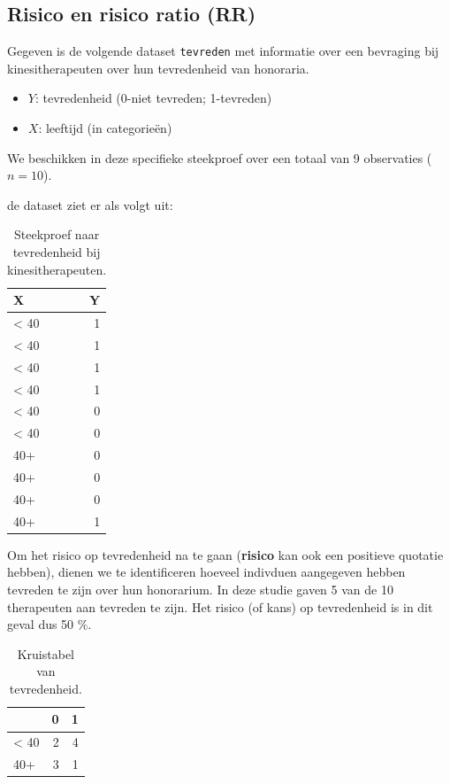 \documentclass[
]{book}
\providecommand{\tightlist}{%
  \setlength{\itemsep}{0pt}\setlength{\parskip}{0pt}}
\theoremstyle{definition}
\theoremstyle{definition}
\theoremstyle{definition}
\theoremstyle{definition}
\theoremstyle{remark}
\begin{document}
\hypertarget{risico-en-risico-ratio-rr}{%
\subsection*{Risico en risico ratio (RR)}\label{risico-en-risico-ratio-rr}}


Gegeven is de volgende dataset \texttt{tevreden} met informatie over een bevraging bij kinesitherapeuten over hun tevredenheid van honoraria.

\begin{itemize}
\tightlist
\item
  \(Y\): tevredenheid (0-niet tevreden; 1-tevreden)
\item
  \(X\): leeftijd (in categorieën)
\end{itemize}

We beschikken in deze specifieke steekproef over een totaal van 9 observaties (\(n = 10\)).

de dataset ziet er als volgt uit:

\begin{table}

\caption{\label{tab:tevereden3}Steekproef naar tevredenheid bij kinesitherapeuten.}
\centering
\begin{tabular}[t]{lr}
\toprule
X & Y\\
\midrule
< 40 & 1\\
< 40 & 1\\
< 40 & 1\\
< 40 & 1\\
< 40 & 0\\
\addlinespace
< 40 & 0\\
40+ & 0\\
40+ & 0\\
40+ & 0\\
40+ & 1\\
\bottomrule
\end{tabular}
\end{table}

Om het risico op tevredenheid na te gaan (\textbf{risico} kan ook een positieve quotatie hebben), dienen we te identificeren hoeveel indivduen aangegeven hebben tevreden te zijn over hun honorarium. In deze studie gaven 5 van de 10 therapeuten aan tevreden te zijn. Het risico (of kans) op tevredenheid is in dit geval dus 50 \(\%\).

\begin{table}

\caption{\label{tab:teveredenX}Kruistabel van tevredenheid.}
\centering
\begin{tabular}[t]{lrr}
\toprule
  & 0 & 1\\
\midrule
< 40 & 2 & 4\\
40+ & 3 & 1\\
\bottomrule
\end{tabular}
\end{table}
\end{document}
